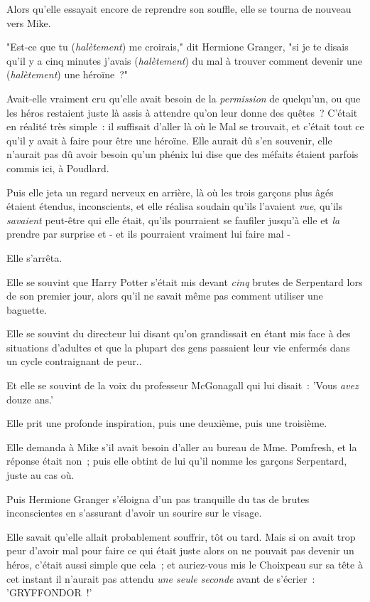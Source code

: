 Alors qu'elle essayait encore de reprendre son souffle, elle se tourna de nouveau vers Mike.

"Est-ce que tu (\emph{halètement}) me croirais," dit Hermione Granger, "si je te disais qu'il y a cinq minutes j'avais (\emph{halètement}) du mal à trouver comment devenir une (\emph{halètement}) une héroïne~?"

Avait-elle vraiment cru qu'elle avait besoin de la \emph{permission} de quelqu'un, ou que les héros restaient juste là assis à attendre qu'on leur donne des quêtes~? C'était en réalité très simple~: il suffisait d'aller là où le Mal se trouvait, et c'était tout ce qu'il y avait à faire pour être une héroïne. Elle aurait dû s'en souvenir, elle n'aurait pas dû avoir besoin qu'un phénix lui dise que des méfaits étaient parfois commis ici, à Poudlard.

Puis elle jeta un regard nerveux en arrière, là où les trois garçons plus âgés étaient étendus, inconscients, et elle réalisa soudain qu'ils l'avaient \emph{vue}, qu'ils \emph{savaient} peut-être qui elle était, qu'ils pourraient se faufiler jusqu'à elle et \emph{la} prendre par surprise et - et ils pourraient vraiment lui faire mal -

Elle s'arrêta.

Elle se souvint que Harry Potter s'était mis devant \emph{cinq} brutes de Serpentard lors de son premier jour, alors qu'il ne savait même pas comment utiliser une baguette.

Elle se souvint du directeur lui disant qu'on grandissait en étant mis face à des situations d'adultes et que la plupart des gens passaient leur vie enfermés dans un cycle contraignant de peur..

Et elle se souvint de la voix du professeur McGonagall qui lui disait~: 'Vous \emph{avez} douze ans.'

Elle prit une profonde inspiration, puis une deuxième, puis une troisième.

Elle demanda à Mike s'il avait besoin d'aller au bureau de Mme. Pomfresh, et la réponse était non~; puis elle obtint de lui qu'il nomme les garçons Serpentard, juste au cas où.

Puis Hermione Granger s'éloigna d'un pas tranquille du tas de brutes inconscientes en s'assurant d'avoir un sourire sur le visage.

Elle savait qu'elle allait probablement souffrir, tôt ou tard. Mais si on avait trop peur d'avoir mal pour faire ce qui était juste alors on ne pouvait pas devenir un héros, c'était aussi simple que cela~; et auriez-vous mis le Choixpeau sur sa tête à cet instant il n'aurait pas attendu \emph{une seule seconde} avant de s'écrier~: 'GRYFFONDOR~!'

